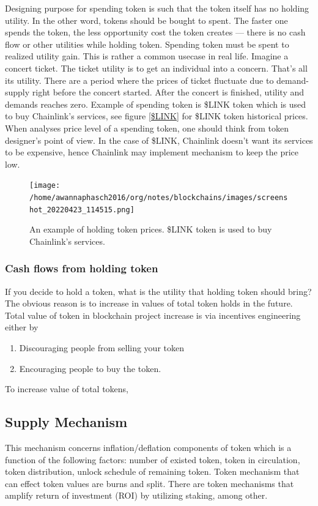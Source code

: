 \documentclass{IEEEtran}
\begin{document}
Designing purpose for spending token is such that the token itself has no holding utility. In the other word, tokens should be bought to spent. The faster one spends the token, the less opportunity cost the token creates --- there is no cash flow or other utilities while holding token. Spending token must be spent to realized utility gain. This is rather a common usecase in real life. Imagine a concert ticket. The ticket utility is to get an individual into a concern. That's all its utility. There are a period where the prices of ticket fluctuate due to demand-supply right before the concert started. After the concert is finished, utility and demands reaches zero. Example of spending token is \$LINK token which is used to buy Chainlink's services, see figure \ref{$LINK} for \$LINK token historical prices. When analyses price level of a spending token, one should think from token designer's point of view. In the case of \$LINK, Chainlink doesn't want its services to be expensive, hence Chainlink may implement mechanism to keep the price low.

\begin{figure}[htbp]
\centering
\texttt{[image: /home/awannaphasch2016/org/notes/blockchains/images/screenshot\_20220423\_114515.png]}
\caption{\label{$LINK token historical prices.}An example of holding token prices. \$LINK token is used to buy Chainlink's services.}
\end{figure}

\subsubsection{Cash flows from holding token}
\label{sec:org3e19d67}
If you decide to hold a token, what is the utility that holding token should bring? The obvious reason is to increase in values of total token holds in the future. Total value of token in blockchain project increase is via incentives engineering either by
\begin{enumerate}
\item Discouraging people from selling your token
\item Encouraging people to buy the token.
\end{enumerate}

To increase value of total tokens,

\subsection{Supply Mechanism}
\label{sec:org1c960a6}
This mechanism concerns inflation/deflation components of token which is a function of the following factors: number of existed token, token in circulation, token distribution, unlock schedule of remaining token. Token mechanism that can effect token values are burns and split. There are token mechanisms that amplify return of investment (ROI) by utilizing staking, among other.
\end{document}
